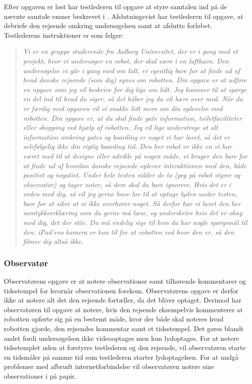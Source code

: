 Efter opgaven er løst har testlederen til opgave at styre samtalen ind på de nævnte samtale emner beskrevet i . Afslutningsvist har testlederen til opgave, at debriefe den rejsende omkring undersøgelsen samt at afslutte forløbet.\blankline
%
Testlederens instruktioner er som følger:
%
\begin{quotation}
\noindent
\textit{Vi er en gruppe studerende fra Aalborg Universitet, der er i gang med et projekt, hvor vi undersøger en robot, der skal være i en lufthavn. Den undersøgelse vi går i gang med om lidt, er egentlig bare for at finde ud af hvad danske rejsende (som dig) synes om robotten.\blankline
%
Din opgave er at udføre en opgave som jeg vil beskrive for dig lige om lidt. Jeg kommer til at spørge en del ind til hvad du siger, så det håber jeg du vil bære over med. Når du er færdig med opgaven vil vi snakke lidt mere om din oplevelse med robotten.\blankline  
%
Din opgave er, at du skal finde gate information, toiletfaciliteter eller shopping ved hjælp af robotten. Jeg vil lige understrege at alt information omkring gates og boarding er noget vi har lavet, så det er selvfølgelig ikke din rigtig boarding tid.\blankline 
%
Den her robot er ikke en vi har været med til at designe eller udvikle på nogen måde, vi bruger den bare for at finde ud af hvordan danske rejsende oplever interaktionen med den, både positivt og negativt.\blankline
%
Under hele testen sidder de to (peg på robot styrer og observatør) og tager noter, så dem skal du bare ignorere. \blankline
%
Hvis det er i orden med dig, så vil jeg gerne have lov til at optage lyden under testen, bare for at sikre at vi ikke overhører noget. Så derfor har vi lavet den her samtykkeerklæring som du gerne må læse, og underskrive hvis det er okay med dig, det der står. Du må endelig sige til hvis du har nogle spørgsmål til den. iPad'ens kamera er kun til for at robotten ved hvor den er, så den filmer dig altså ikke.}
\end{quotation}
   

\subsubsection*{Observatør}
Observatørens opgave er at notere observationer samt tilhørende kommentarer og tidsstempel for hvornår observationen forekom. Observatørens opgave er derfor ikke at notere alt det den rejsende fortæller, da det bliver optaget. Derimod har observatøren til opgave at notere, hvis den rejsende eksempelvis kommenterer at robotten opførte sig på en bestemt måde, hvor der både skal noteres hvad robotten gjorde, den rejsendes kommentar samt et tidsstempel. Det gøres blandt andet fordi undersøgelsen ikke videooptages men kun lydoptages. For at notere tidsstemplet uden at forstyrre testlederen og den rejsende, vil observatøren starte en tidsmåler på samme tid som testlederen starter lydoptagelsen. For at undgå problemer med afbrudt internetforbindelse vil observatøren notere sine observationer i på papir.      
 
